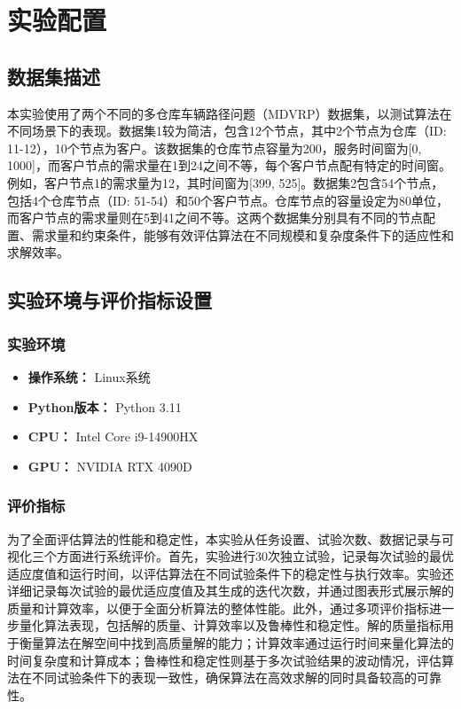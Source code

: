 \documentclass[12pt,a4paper,oneside]{ctexart}
\begin{document}
	
\section{实验配置}

\subsection{数据集描述}

本实验使用了两个不同的多仓库车辆路径问题（MDVRP）数据集，以测试算法在不同场景下的表现。数据集1较为简洁，包含12个节点，其中2个节点为仓库（ID: 11-12），10个节点为客户。该数据集的仓库节点容量为200，服务时间窗为[0, 1000]，而客户节点的需求量在1到24之间不等，每个客户节点配有特定的时间窗。例如，客户节点1的需求量为12，其时间窗为[399, 525]。数据集2包含54个节点，包括4个仓库节点（ID: 51-54）和50个客户节点。仓库节点的容量设定为80单位，而客户节点的需求量则在5到41之间不等。这两个数据集分别具有不同的节点配置、需求量和约束条件，能够有效评估算法在不同规模和复杂度条件下的适应性和求解效率。

\subsection{实验环境与评价指标设置}

\subsubsection{实验环境}

\begin{itemize}
	\item \textbf{操作系统：} Linux系统
	\item \textbf{Python版本：} Python 3.11
	\item \textbf{CPU：} Intel Core i9-14900HX
	\item \textbf{GPU：} NVIDIA RTX 4090D
\end{itemize}

\subsubsection{评价指标}
为了全面评估算法的性能和稳定性，本实验从任务设置、试验次数、数据记录与可视化三个方面进行系统评价。首先，实验进行30次独立试验，记录每次试验的最优适应度值和运行时间，以评估算法在不同试验条件下的稳定性与执行效率。实验还详细记录每次试验的最优适应度值及其生成的迭代次数，并通过图表形式展示解的质量和计算效率，以便于全面分析算法的整体性能。此外，通过多项评价指标进一步量化算法表现，包括解的质量、计算效率以及鲁棒性和稳定性。解的质量指标用于衡量算法在解空间中找到高质量解的能力；计算效率通过运行时间来量化算法的时间复杂度和计算成本；鲁棒性和稳定性则基于多次试验结果的波动情况，评估算法在不同试验条件下的表现一致性，确保算法在高效求解的同时具备较高的可靠性。
\end{document}
